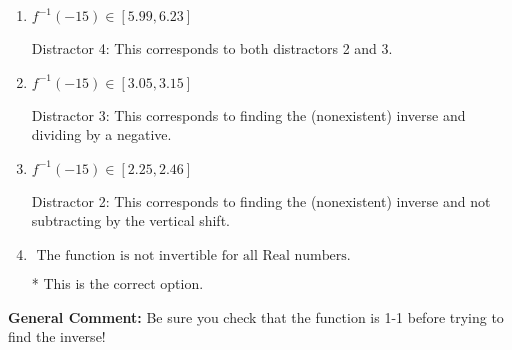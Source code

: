 \documentclass{extbook}[14pt]
\begin{document}
\begin{enumerate}
{\begin{enumerate}[label=\Alph*.]
 Distractor 1: This corresponds to trying to find the inverse even though the function is not 1-1. 
\item \( f^{-1}(-15) \in [5.99, 6.23] \)

 Distractor 4: This corresponds to both distractors 2 and 3.
\item \( f^{-1}(-15) \in [3.05, 3.15] \)

 Distractor 3: This corresponds to finding the (nonexistent) inverse and dividing by a negative.
\item \( f^{-1}(-15) \in [2.25, 2.46] \)

 Distractor 2: This corresponds to finding the (nonexistent) inverse and not subtracting by the vertical shift.
\item \( \text{ The function is not invertible for all Real numbers. } \)

* This is the correct option.
\end{enumerate}

\textbf{General Comment:} Be sure you check that the function is 1-1 before trying to find the inverse!
}
\end{enumerate}
\end{document}
